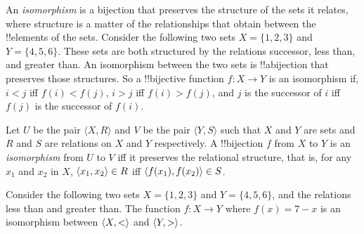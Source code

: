 \documentclass[../../../include/open-logic-section]{subfiles}
\begin{document}

\begin{explain}
An \emph{isomorphism} is a bijection that preserves the structure of
the sets it relates, where structure is a matter of the relationships
that obtain between the !!{element}s of the sets. Consider the
following two sets $X=\{1,2,3\}$ and $Y=\{4,5,6\}$. These sets are
both structured by the relations successor, less than, and greater
than. An isomorphism between the two sets is !!a{bijection} that
preserves those structures. So a !!{bijective} function $f \colon X
\to Y$ is an isomorphism if, $i<j$ iff $f(i)<f(j)$, $i>j$ iff
$f(i)>f(j)$, and $j$ is the successor of $i$ iff $f(j)$ is the
successor of $f(i)$.
\end{explain}

\begin{defn}[Isomorphism]
Let $U$ be the pair $\langle X, R\rangle$ and $V$ be the pair $\langle
Y, S\rangle$ such that $X$ and $Y$ are sets and $R$ and $S$ are
relations on $X$ and $Y$ respectively. A !!{bijection} $f$ from $X$ to
$Y$ is an \emph{isomorphism} from $U$ to $V$ iff it preserves the
relational structure, that is, for any $x_{1}$ and $x_{2}$ in $X$,
$\langle x_1,x_2 \rangle \in R$ iff $\langle f(x_1),f(x_2) \rangle \in S$.
\end{defn}

\begin{ex}
Consider the following two sets $X=\{1,2,3\}$ and $Y=\{4,5,6\}$, and
the relations less than and greater than. The function $f\colon X \to
Y$ where $f(x) = 7-x$ is an isomorphism between $\langle X,< \rangle$ and
$\langle Y,> \rangle$.
\end{ex}
\end{document}
